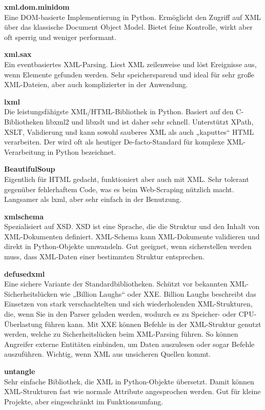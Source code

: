 \textbf{xml.dom.minidom}\\
Eine DOM-basierte Implementierung in Python.
Ermöglicht den Zugriff auf XML über das klassische Document Object Model.
Bietet feine Kontrolle, wirkt aber oft sperrig und weniger performant. \cite*{xml.dom.minidom}

\textbf{xml.sax}\\
Ein eventbasiertes XML-Parsing.
Liest XML zeilenweise und löst Ereignisse aus, wenn Elemente gefunden werden.
Sehr speichersparend und ideal für sehr große XML-Dateien, aber auch komplizierter in der Anwendung. \cite*{xml.sax}

\textbf{lxml}\\
Die leistungsfähigste XML/HTML-Bibliothek in Python.
Basiert auf den C-Bibliotheken libxml2 und libxslt und ist daher sehr schnell.
Unterstützt XPath, \ac{XSLT}, Validierung und kann sowohl sauberes XML als auch „kaputtes“ HTML verarbeiten.
Der wird oft als heutiger De-facto-Standard für komplexe XML-Verarbeitung in Python bezeichnet. \cite*{lxml}

\textbf{BeautifulSoup}\\
Eigentlich für HTML gedacht, funktioniert aber auch mit XML. Sehr tolerant gegenüber fehlerhaftem Code, was es beim Web-Scraping nützlich macht.
Langsamer als lxml, aber sehr einfach in der Benutzung. \cite*{BeautifulSoup}

\textbf{xmlschema}\\
Spezialisiert auf \ac{XSD}.
\ac{XSD} ist eine Sprache, die die Struktur und den Inhalt von XML-Dokumenten definiert.
XML-Schema kann XML-Dokumente validieren und direkt in Python-Objekte umwandeln.
Gut geeignet, wenn sicherstellen werden muss, dass XML-Daten einer bestimmten Struktur entsprechen. \cite*{xmlschema}

\textbf{defusedxml}\\
Eine sichere Variante der Standardbibliotheken.
Schützt vor bekannten XML-Sicherheitslücken wie „Billion Laughs“ oder \ac{XXE}.
Billion Laughs beschreibt das Einsetzen von stark verschachtelten und sich wiederholenden \ac{XML}-Strukturen, die, wenn Sie in
den Parser geladen werden, wodurch es zu Speicher- oder CPU-Überlastung führen kann.
Mit \ac{XXE} können Befehle in der XML-Struktur genutzt werden, welche zu Sicherheitslücken beim XML-Parsing führen.
So können Angreifer externe Entitäten einbinden, um Daten auszulesen oder sogar Befehle auszuführen.
Wichtig, wenn XML aus unsicheren Quellen kommt. \cite*{defusedxml}

\textbf{untangle}\\
Sehr einfache Bibliothek, die XML in Python-Objekte übersetzt.
Damit können XML-Strukturen fast wie normale Attribute angesprochen werden.
Gut für kleine Projekte, aber eingeschränkt im Funktionsumfang. \cite*{untangle}